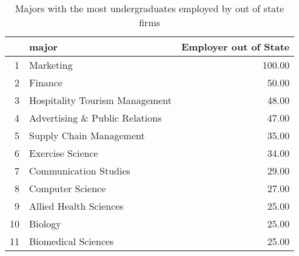 \begin{table}[ht]
\centering
\begin{tabular}{rlr}
  \hline
 & major & Employer out of State \\ 
  \hline
1 & Marketing & 100.00 \\ 
  2 & Finance & 50.00 \\ 
  3 & Hospitality Tourism Management & 48.00 \\ 
  4 & Advertising \& Public Relations & 47.00 \\ 
  5 & Supply Chain Management & 35.00 \\ 
  6 & Exercise Science & 34.00 \\ 
  7 & Communication Studies & 29.00 \\ 
  8 & Computer Science & 27.00 \\ 
  9 & Allied Health Sciences & 25.00 \\ 
  10 & Biology & 25.00 \\ 
  11 & Biomedical Sciences & 25.00 \\ 
   \hline
\end{tabular}
\caption{Majors with the most undergraduates employed by out of state firms} 
\end{table}
